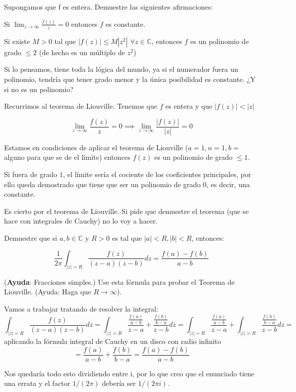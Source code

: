 \begin{problem}[9]
Supongamos que f es entera. Demuestre las siguientes afirmaciones:

\ppart Si $\displaystyle \lim_{z\to ∞} \frac{f(z)}{z} = 0$ entonces $f$ es constante.

\ppart Si existe $M>0$ tal que $|f(z)| \leq M |z^2|$ $∀z∈ℂ$, entonces $f$ es un polinomio de grado $\leq 2$ (de hecho es un múltiplo de $z^2$)
\solution


\spart Si lo pensamos, tiene toda la lógica del mundo, ya si el numerador fuera un polinomio, tendría que tener grado menor y la única posibilidad es constante. ¿Y si no es un polinomio?

Recurrimos al teorema de Liouville. Tenemos que $f$ es entera y que $|f(z)| < |z|$

\[
\lim_{z\to ∞} \frac{f(z)}{z}=0 \implies \lim_{z\to ∞} \frac{|f(z)|}{|z|} = 0
\]

Estamos en condiciones de aplicar el teorema de Liouville ($a=1,n=1,b=$alguno para que se de el límite) entonces $f(z)$ es un polinomio de grado $\leq 1$.

Si fuera de grado $1$, el límite sería el cociente de los coeficientes principales, por ello queda demostrado que tiene que ser un polinomio de grado 0, es decir, una constante.

\spart Es cierto por el teorema de Liouville. Si pide que demuestre el teorema (que se hace con integrales de Cauchy) no lo voy a hacer.

\end{problem}


\begin{problem}[10]
Demuestre que si $a,b∈ℂ$ y $R>0$ es tal que $|a| < R, |b| < R$, entonces:

\[
\frac{1}{2π}\int_{|z| = R} \frac{f(z)}{(z-a)(z-b)} dz = \frac{f(a) - f(b)}{a-b}
\]

(\textbf{Ayuda}: Fracciones simples.) Use esta fórmula para probar el Teorema de Liouville. (Ayuda: Haga que $R \to \infty$).

\solution
{}

Vamos a trabajar tratando de resolver la integral:
\[\int_{|z| = R} \frac{f(z)}{(z-a)(z-b)} dz = \int_{|z| = R} \frac{\frac{f(a)}{a-b}}{z-a}+\frac{\frac{f(b)}{b-a}}{z-b}dz=\int_{|z| = R} \frac{\frac{f(a)}{a-b}}{z-a}+\int_{|z| = R}\frac{\frac{f(b)}{b-a}}{z-b}dz=\]
aplicando la fórmula integral de Cauchy en un disco con radio infinito
\[=\frac{f(a)}{a-b}+\frac{f(b)}{b-a}=\frac{f(a)-f(b)}{a-b}\]

Nos quedaría todo esto dividiendo entre i, por lo que creo que el enunciado tiene una errata y el factor $1/(2π)$ debería ser $1/(2πi)$.
\end{problem}

